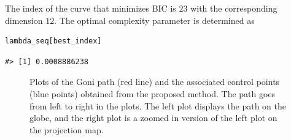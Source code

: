 The index of the curve that minimizes BIC is \(23\) with the corresponding dimension \(12\). The optimal complexity parameter is determined as

\begin{verbatim}
lambda_seq[best_index]
\end{verbatim}

\begin{verbatim}
#> [1] 0.0008886238
\end{verbatim}

\begin{figure}

{\centering {}

}

\caption{Plots of the Goni path (red line) and the associated control points (blue points) obtained from the proposed method. The path goes from left to right in the plots. The left plot displays the path on the globe, and the right plot is a zoomed in version of the left plot on the projection map.}\label{fig:Goni}
\end{figure}

